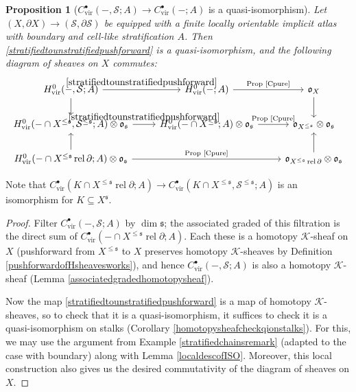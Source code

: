 \documentclass[12pt]{article}
\newtheorem{proposition}[theorem]{Proposition}
\theoremstyle{definition}
\theoremstyle{remark}
\numberwithin{equation}{subsection}
\newcommand{\K}{\mathcal K}
\newcommand{\s}{\mathfrak s}
\newcommand{\oo}{\mathfrak o}
\newcommand{\SSS}{\mathcal S}
\newcommand{\vir}{\mathrm{vir}}
\newcommand{\rel}{\operatorname{rel}}
\begin{document}
\begin{proposition}[$C^\bullet_\vir(-,\SSS;A)\to C^\bullet_\vir(-;A)$ is a quasi-isomorphism]\label{stratifiedispurehomotopysheaf}
Let $(X,\partial X)\to(\SSS,\partial\SSS)$ be equipped with a finite locally orientable implicit atlas with boundary and cell-like stratification $A$.  Then \eqref{stratifiedtounstratifiedpushforward} is a quasi-isomorphism, and the following diagram of sheaves on $X$ commutes:
\begin{equation*}%
\begin{tikzcd}
H^0_\vir(-,\SSS;A)\ar{d}\ar{r}{\eqref{stratifiedtounstratifiedpushforward}}&H^0_\vir(-;A)\ar{r}{\text{Prop \ref{Cpure}}}&\oo_X\ar{d}\\
H^0_\vir(-\cap X^{\leq\s},\SSS^{\leq\s};A)\otimes\oo_\s\ar{r}{\eqref{stratifiedtounstratifiedpushforward}}&H^0_\vir(-\cap X^{\leq\s};A)\otimes\oo_\s\ar{r}{\text{Prop \ref{Cpure}}}&\oo_{X^{\leq\s}}\otimes\oo_\s\\
H^0_\vir(-\cap X^{\leq\s}\rel\partial;A)\otimes\oo_\s\ar{u}\ar{rr}{\text{Prop \ref{Cpure}}}&&\oo_{X^{\leq\s}\rel\partial}\otimes\oo_\s\ar{u}
\end{tikzcd}
\end{equation*}
\end{proposition}

Note that $C^\bullet_\vir(K\cap X^{\leq\s}\rel\partial;A)\to C^\bullet_\vir(K\cap X^{\leq\s},\SSS^{\leq\s};A)$ is an isomorphism for $K\subseteq X^\s$.

\begin{proof}
Filter $C^\bullet_\vir(-,\SSS;A)$ by $\dim\s$; the associated graded of this filtration is the direct sum of $C^\bullet_\vir(-\cap X^{\leq\s}\rel\partial;A)$.  Each these is a homotopy $\K$-sheaf on $X$ (pushforward from $X^{\leq\s}$ to $X$ preserves homotopy $\K$-sheaves by Definition \ref{pushforwardofHsheavesworks}), and hence $C^\bullet_\vir(-,\SSS;A)$ is also a homotopy $\K$-sheaf (Lemma \ref{associatedgradedhomotopysheaf}).

Now the map \eqref{stratifiedtounstratifiedpushforward} is a map of homotopy $\K$-sheaves, so to check that it is a quasi-isomorphism, it suffices to check it is a quasi-isomorphism on stalks (Corollary \ref{homotopysheafcheckqionstalks}).  For this, we may use the argument from Example \ref{stratifiedchainsremark} (adapted to the case with boundary) along with Lemma \ref{localdescofISO}.  Moreover, this local construction also gives us the desired commutativity of the diagram of sheaves on $X$.
\end{proof}
\end{document}
